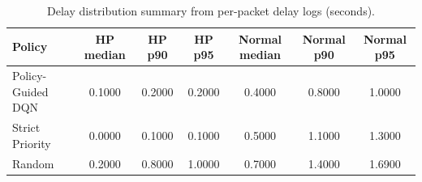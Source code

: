 \begin{table}[t]
\centering
\caption{Delay distribution summary from per-packet delay logs (seconds).}
\label{tab:delay_percentiles}
\scriptsize
\begin{tabular}{lcccccc}
\toprule
Policy & HP median & HP p90 & HP p95 & Normal median & Normal p90 & Normal p95 \\
\midrule
Policy-Guided DQN & 0.1000 & 0.2000 & 0.2000 & 0.4000 & 0.8000 & 1.0000 \\
Strict Priority & 0.0000 & 0.1000 & 0.1000 & 0.5000 & 1.1000 & 1.3000 \\
Random & 0.2000 & 0.8000 & 1.0000 & 0.7000 & 1.4000 & 1.6900 \\
\bottomrule
\end{tabular}
\end{table}

